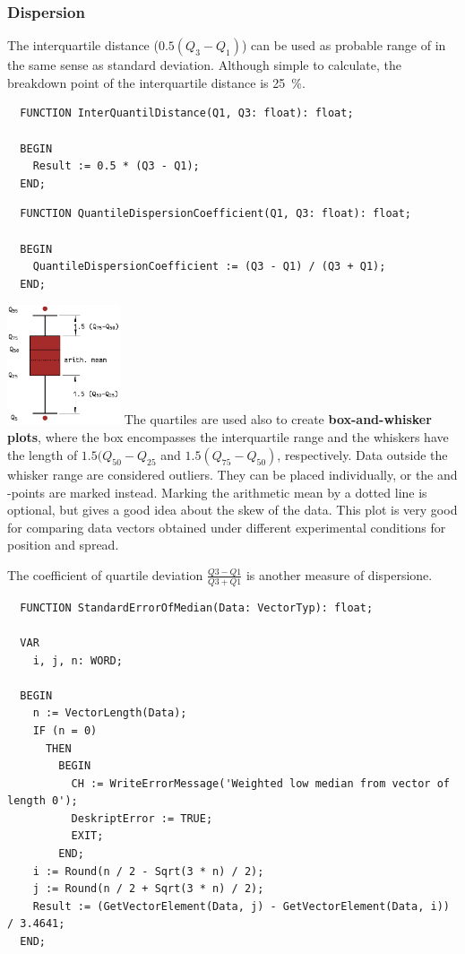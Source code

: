 \begin{refsection}
\subsubsection{Dispersion}

The interquartile distance (\( 0.5 (Q_3 - Q_1) \)) can be used as probable range of  in the same sense as standard deviation. Although simple to calculate, the breakdown point of the interquartile distance is \SI{25}{\%}.

\begin{lstlisting}
  FUNCTION InterQuantilDistance(Q1, Q3: float): float;

  BEGIN
    Result := 0.5 * (Q3 - Q1);
  END;
\end{lstlisting}

\begin{lstlisting}
  FUNCTION QuantileDispersionCoefficient(Q1, Q3: float): float;

  BEGIN
    QuantileDispersionCoefficient := (Q3 - Q1) / (Q3 + Q1);
  END;
\end{lstlisting}

\includegraphics[width=0.25\textwidth]{Graphics/Box-and-Wisker} The quartiles are used also to create \textbf{box-and-whisker plots}, where the box encompasses the interquartile range and the whiskers have the length of \(1.5 (Q_{50}-Q_{25} \) and \(1.5 (Q_{75}-Q_{50}) \), respectively. Data outside the whisker range are considered outliers. They can be placed individually, or the  and -points are marked instead. Marking the arithmetic mean by a dotted line is optional, but gives a good idea about the skew of the data. This plot is very good for comparing data vectors obtained under different experimental conditions for position and spread.

The coefficient of quartile deviation \( \frac{Q3-Q1}{Q3+Q1} \) is another measure of dispersione.

\begin{lstlisting}
  FUNCTION StandardErrorOfMedian(Data: VectorTyp): float;

  VAR
    i, j, n: WORD;

  BEGIN
    n := VectorLength(Data);
    IF (n = 0)
      THEN
        BEGIN
          CH := WriteErrorMessage('Weighted low median from vector of length 0');
          DeskriptError := TRUE;
          EXIT;
        END;
    i := Round(n / 2 - Sqrt(3 * n) / 2);
    j := Round(n / 2 + Sqrt(3 * n) / 2);
    Result := (GetVectorElement(Data, j) - GetVectorElement(Data, i)) / 3.4641;
  END;
\end{lstlisting}


\end{refsection}
